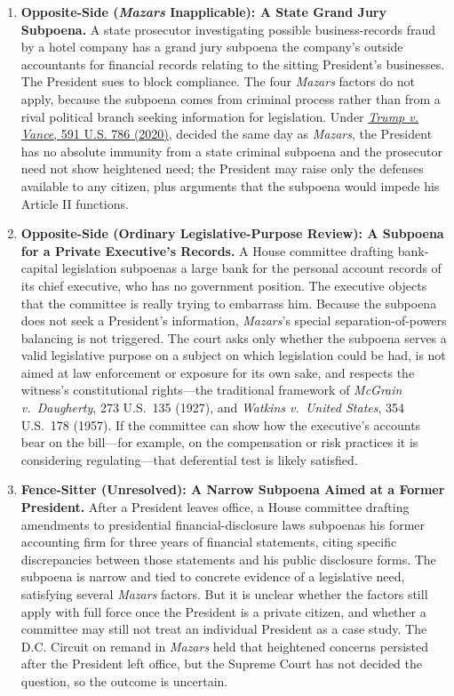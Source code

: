 \documentclass[12pt]{article}
\begin{document}
\begin{enumerate}
\item \textbf{Opposite-Side (\textit{Mazars} Inapplicable): A State Grand Jury Subpoena.} A state prosecutor investigating possible business-records fraud by a hotel company has a grand jury subpoena the company's outside accountants for financial records relating to the sitting President's businesses. The President sues to block compliance. The four \textit{Mazars} factors do not apply, because the subpoena comes from criminal process rather than from a rival political branch seeking information for legislation. Under \href{https://www.law.cornell.edu/supremecourt/text/19-635}{\textit{Trump v. Vance}, 591 U.S. 786 (2020)}, decided the same day as \textit{Mazars}, the President has no absolute immunity from a state criminal subpoena and the prosecutor need not show heightened need; the President may raise only the defenses available to any citizen, plus arguments that the subpoena would impede his Article II functions.

\item \textbf{Opposite-Side (Ordinary Legislative-Purpose Review): A Subpoena for a Private Executive's Records.} A House committee drafting bank-capital legislation subpoenas a large bank for the personal account records of its chief executive, who has no government position. The executive objects that the committee is really trying to embarrass him. Because the subpoena does not seek a President's information, \textit{Mazars}'s special separation-of-powers balancing is not triggered. The court asks only whether the subpoena serves a valid legislative purpose on a subject on which legislation could be had, is not aimed at law enforcement or exposure for its own sake, and respects the witness's constitutional rights---the traditional framework of \textit{McGrain v.\ Daugherty}, 273 U.S.\ 135 (1927), and \textit{Watkins v.\ United States}, 354 U.S.\ 178 (1957). If the committee can show how the executive's accounts bear on the bill---for example, on the compensation or risk practices it is considering regulating---that deferential test is likely satisfied.

\item \textbf{Fence-Sitter (Unresolved): A Narrow Subpoena Aimed at a Former President.} After a President leaves office, a House committee drafting amendments to presidential financial-disclosure laws subpoenas his former accounting firm for three years of financial statements, citing specific discrepancies between those statements and his public disclosure forms. The subpoena is narrow and tied to concrete evidence of a legislative need, satisfying several \textit{Mazars} factors. But it is unclear whether the factors still apply with full force once the President is a private citizen, and whether a committee may still not treat an individual President as a case study. The D.C. Circuit on remand in \textit{Mazars} held that heightened concerns persisted after the President left office, but the Supreme Court has not decided the question, so the outcome is uncertain.

\end{enumerate}
\end{document}
